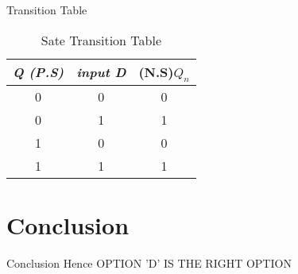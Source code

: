 \documentclass{beamer}
\begin{document}
\begin{frame}{Transition Table}

  \begin{table}[h]
   \centering
   \begin{tabular}{|c|c|c|}
   \hline
   \textit{\textbf{Q (P.S) }}&\textit{\textbf{input D}} &\textbf{(N.S)$Q_n$} \\ \hline
    0 & 0    &  0     \\ \hline
    0 & 1    &  1     \\ \hline
    1 & 0    &  0     \\\hline
    1 & 1    &  1     \\ \hline
    \hline
   \end{tabular}
  \caption{Sate Transition Table }
\label{tab:table1}
\end{table}
\end{frame}

\section{Conclusion}
\begin{frame}{Conclusion}
     Hence  OPTION 'D' IS THE RIGHT OPTION
    
\begin{figure}[h]
    \centering
     
\end{figure}
\end{frame}
\end{document}
